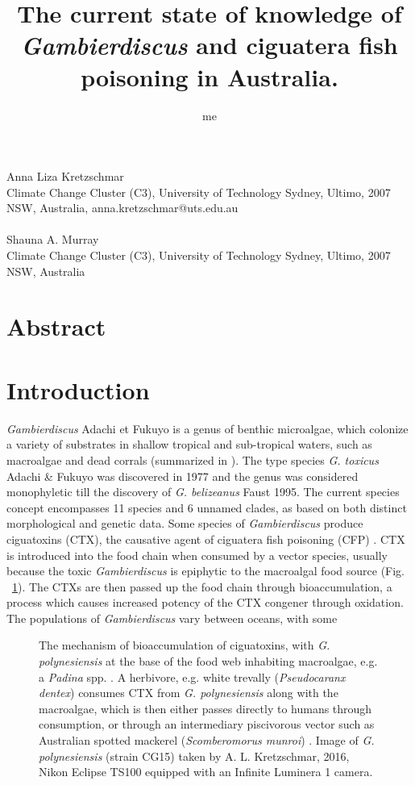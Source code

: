 \documentclass[12pt]{article}
\title{The current state of knowledge of \emph{Gambierdiscus} and ciguatera fish poisoning in Australia.}
\author{me}
\date{}
\begin{document}
\maketitle
\paragraph{}Anna Liza Kretzschmar\\
Climate Change Cluster (C3), University of Technology Sydney, Ultimo, 2007 NSW, Australia, anna.kretzschmar@uts.edu.au
\paragraph{}Shauna A. Murray\\
Climate Change Cluster (C3), University of Technology Sydney, Ultimo, 2007 NSW, Australia
\newpage
\section*{Abstract}


\section*{Introduction}
\textit{Gambierdiscus} Adachi et Fukuyo is a genus of benthic microalgae, which colonize a variety of substrates in shallow tropical and sub-tropical waters, such as macroalgae and dead corrals (summarized in \cite{hoppenrath2014marine}).
The type species \emph{G. toxicus} Adachi \& Fukuyo was discovered in 1977 and the genus was considered monophyletic till the discovery of \emph{G. belizeanus} Faust 1995. The current species concept encompasses 11 species and 6 unnamed clades, as based on both distinct morphological and genetic data.
Some species of \emph{Gambierdiscus} produce ciguatoxins (CTX), the causative agent of ciguatera fish poisoning (CFP) \cite{berdalet2012global}. CTX is introduced into the food chain when consumed by a vector species, usually because the toxic \emph{Gambierdiscus} is epiphytic to the macroalgal food source (Fig. ~\ref{fig:bioacc}). The CTXs are then passed up the food chain through bioaccumulation, a process which causes increased potency of the CTX congener through oxidation.
The populations of \emph{Gambierdiscus} vary between oceans, with some 

\FloatBarrier
\begin{figure} 
\caption{The mechanism of bioaccumulation of ciguatoxins, with \emph{G. polynesiensis} at the base of the food web inhabiting macroalgae, e.g. a \emph{Padina} spp. \cite{padina}. A herbivore, e.g. white trevally (\emph{Pseudocaranx dentex}) \cite{trevally} consumes CTX from \emph{G. polynesiensis} along with the macroalgae, which is then either passes directly to humans through consumption, or through an intermediary piscivorous vector such as Australian spotted mackerel (\emph{Scomberomorus munroi}) \cite{mackerel}. Image of \emph{G. polynesiensis} (strain CG15) taken by A. L. Kretzschmar, 2016, Nikon Eclipse TS100 equipped with an Infinite Luminera 1 camera.} 
\label{fig:bioacc}
\end{figure} 
\FloatBarrier
\end{document}
